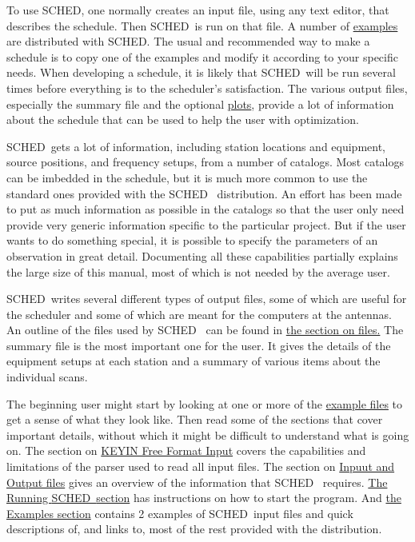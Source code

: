 \documentclass{report}
\newcommand{\sched}{{\sc SCHED}}
\newcommand{\schedb}{{\sc SCHED~}}
\begin{document}
To use \sched, one normally creates an input file, using any text
editor, that describes the schedule.  Then \schedb is run on that
file.  A number of 
{\hyperref[SEC:EXAMPLES]{examples}} are distributed
with \sched.  The usual and recommended way to make a schedule is to
copy one of the examples and modify it according to your specific
needs.  When developing a schedule, it is likely that \schedb will be
run several times before everything is to the scheduler's
satisfaction.  The various output files, especially the summary file
and the optional 
{\hyperref[SEC:PLOT]{plots}}, provide a lot of
information about the schedule that can be used to help the user with
optimization.

\schedb gets a lot of information, including station locations and
equipment, source positions, and frequency setups, from a number of
catalogs.  Most catalogs can be imbedded in the schedule, but it is
much more common to use the standard ones provided with the \schedb
distribution.  An effort has been made to put as much information as
possible in the catalogs so that the user only need provide very
generic information specific to the particular project.  But if the
user wants to do something special, it is possible to specify the
parameters of an observation in great detail.  Documenting all these
capabilities partially explains the large size of this manual, most
of which is not needed by the average user.

\schedb writes several different types of output files, some of which
are useful for the scheduler and some of which are meant for the
computers at the antennas.  An outline of the files used by \schedb
can be found in
\hyperref[SEC:FILES]{the section on files.}
The summary file is the most important one for
the user.  It gives the details of the equipment setups at each
station and a summary of various items about the individual scans.

The beginning user might start by looking at one or more of the
{\hyperref[SEC:EXAMPLES]{example files}} to get a sense of what they look
like.  Then read some of the sections that cover important details,
without which it might be difficult to understand what is going on.
The section on
\hyperref[SEC:KEYIN]{KEYIN Free Format Input}
covers the capabilities and limitations
of the parser used to read all input files.  The section on
\hyperref[SEC:FILES]{Inpuut and Output files}
gives an overview of the information that \schedb
requires.
\hyperref[SEC:RUNSCHED]{The Running \schedb section}
has instructions on how to start the program.  And
\hyperref[SEC:EXAMPLES]{the Examples section}
contains 2 examples of \schedb input files and quick descriptions of,
and links to, most of the rest provided with the distribution.
\end{document}
